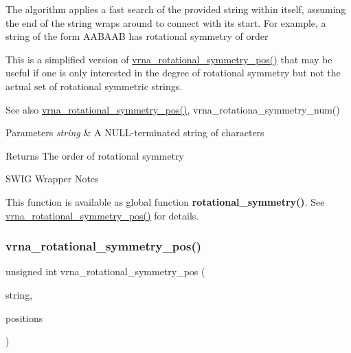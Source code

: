The algorithm applies a fast search of the provided string within itself, assuming the end of the string wraps around to connect with it\textquotesingle{}s start. For example, a string of the form {\ttfamily A\+A\+B\+A\+AB} has rotational symmetry of order {} 

This is a simplified version of \mbox{\hyperlink{group__combinatorics__utils_ga294d48935fcac87ab335d771fe289ecb}{vrna\+\_\+rotational\+\_\+symmetry\+\_\+pos()}} that may be useful if one is only interested in the degree of rotational symmetry but not the actual set of rotational symmetric strings.

\begin{DoxySeeAlso}{See also}
\mbox{\hyperlink{group__combinatorics__utils_ga294d48935fcac87ab335d771fe289ecb}{vrna\+\_\+rotational\+\_\+symmetry\+\_\+pos()}}, vrna\+\_\+rotationa\+\_\+symmetry\+\_\+num()
\end{DoxySeeAlso}

\begin{DoxyParams}{Parameters}
{\em string} & A N\+U\+L\+L-\/terminated string of characters \\
\hline
\end{DoxyParams}
\begin{DoxyReturn}{Returns}
The order of rotational symmetry
\end{DoxyReturn}
\begin{DoxyRefDesc}{S\+W\+I\+G Wrapper Notes}
\item[\mbox{\hyperlink{wrappers__wrappers000018}{S\+W\+I\+G Wrapper Notes}}]This function is available as global function {\bfseries{rotational\+\_\+symmetry()}}. See \mbox{\hyperlink{group__combinatorics__utils_ga294d48935fcac87ab335d771fe289ecb}{vrna\+\_\+rotational\+\_\+symmetry\+\_\+pos()}} for details. \end{DoxyRefDesc}
\mbox{\label{group__combinatorics__utils_ga294d48935fcac87ab335d771fe289ecb}} 
\subsubsection{\texorpdfstring{vrna\_rotational\_symmetry\_pos()}{vrna\_rotational\_symmetry\_pos()}}
{\footnotesize\ttfamily unsigned int vrna\+\_\+rotational\+\_\+symmetry\+\_\+pos (\begin{DoxyParamCaption}\item[{const char $\ast$}]{string,  }\item[{unsigned int $\ast$$\ast$}]{positions }\end{DoxyParamCaption})}




